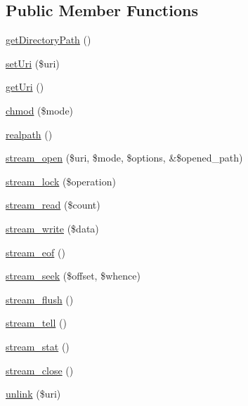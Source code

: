 \subsection*{Public Member Functions}
\begin{DoxyCompactItemize}
\item 
\hyperlink{classDrupalLocalStreamWrapper_a3ff87a4643479303f4880f2381d0f432}{getDirectoryPath} ()
\item 
\hyperlink{classDrupalLocalStreamWrapper_ae9502ad74b2498b9c93e4affc43e7109}{setUri} (\$uri)
\item 
\hyperlink{classDrupalLocalStreamWrapper_a8dc69c121105a00949acfdcce0474aaa}{getUri} ()
\item 
\hyperlink{classDrupalLocalStreamWrapper_a7ea693783119ad777d54d447bddcee8f}{chmod} (\$mode)
\item 
\hyperlink{classDrupalLocalStreamWrapper_a61f0d0ef6a489e3fca2152eb64174237}{realpath} ()
\item 
\hyperlink{classDrupalLocalStreamWrapper_ad4f1fe2a82a1939d4c2d94df90ce61b7}{stream\_\-open} (\$uri, \$mode, \$options, \&\$opened\_\-path)
\item 
\hyperlink{classDrupalLocalStreamWrapper_afd5f70c60440f6ff3a837dd6eeb19b96}{stream\_\-lock} (\$operation)
\item 
\hyperlink{classDrupalLocalStreamWrapper_aa9d440c0bde94aa2ba1dcff6e5f54f31}{stream\_\-read} (\$count)
\item 
\hyperlink{classDrupalLocalStreamWrapper_af10477b614bdec57f999056f879895d2}{stream\_\-write} (\$data)
\item 
\hyperlink{classDrupalLocalStreamWrapper_ad9167268d5bfa2e82356552136ebec7a}{stream\_\-eof} ()
\item 
\hyperlink{classDrupalLocalStreamWrapper_a3e1029b8c14d53557dc0c241a804662d}{stream\_\-seek} (\$offset, \$whence)
\item 
\hyperlink{classDrupalLocalStreamWrapper_ae0c67f28057a775ff795747bcb944aab}{stream\_\-flush} ()
\item 
\hyperlink{classDrupalLocalStreamWrapper_a2d9711b5c3f38c821fe59d14b7e9e2fe}{stream\_\-tell} ()
\item 
\hyperlink{classDrupalLocalStreamWrapper_ab9f190ff1874ea68611fd6f4c160b8ae}{stream\_\-stat} ()
\item 
\hyperlink{classDrupalLocalStreamWrapper_ac10b105d5d7cf732ea22db1c6545e2a3}{stream\_\-close} ()
\item 
\hyperlink{classDrupalLocalStreamWrapper_af40b6f2725d9df2029ecac8b6e25dab8}{unlink} (\$uri)

\end{DoxyCompactItemize}
